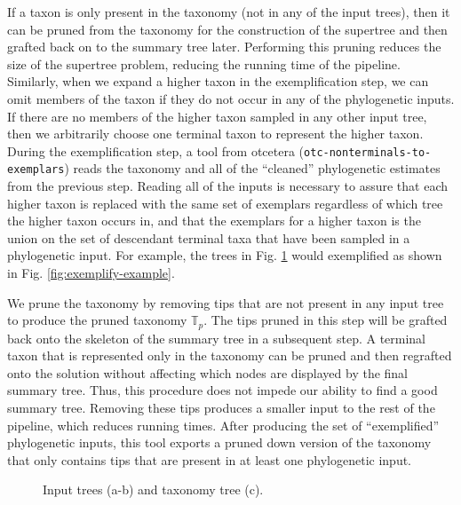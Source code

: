 \documentclass[fleqn,12pt,lineno,english]{wlpeerj}
\begin{document}
If a taxon is only present in the taxonomy (not in any of the input
trees), then it can be pruned from the taxonomy for the construction
of the supertree and then grafted back on to the summary tree later.
Performing this pruning reduces the size of the supertree problem,
reducing the running time of the pipeline. Similarly, when we expand
a higher taxon in the exemplification step, we can omit members of
the taxon if they do not occur in any of the phylogenetic inputs.
If there are no members of the higher taxon sampled in any other input
tree, then we arbitrarily choose one terminal taxon to represent the
higher taxon. During the exemplification step, a tool from otcetera
(\texttt{otc-nonterminals-to-exemplars}) reads the taxonomy and all
of the ``cleaned'' phylogenetic estimates from the previous step.
Reading all of the inputs is necessary to assure that each higher
taxon is replaced with the same set of exemplars regardless of which
tree the higher taxon occurs in, and that the exemplars for a higher
taxon is the union on the set of descendant terminal taxa that have
been sampled in a phylogenetic input. For example, the trees in Fig.
\ref{fig:cleaned-phylo-example} would exemplified as shown in Fig.
\ref{fig:exemplify-example}.

We prune the taxonomy by removing tips that are not present in any
input tree to produce the pruned taxonomy $\mathbb{T}_{p}$. The tips
pruned in this step will be grafted back onto the skeleton of the
summary tree in a subsequent step. A terminal taxon that is represented
only in the taxonomy can be pruned and then regrafted onto the solution
without affecting which nodes are displayed by the final summary tree.
Thus, this procedure does not impede our ability to find a good summary
tree. Removing these tips produces a smaller input to the rest of
the pipeline, which reduces running times. After producing the set
of ``exemplified'' phylogenetic inputs, this tool exports a pruned
down version of the taxonomy that only contains tips that are present
in at least one phylogenetic input.

\begin{figure}
\hfill{}\hfill{}

\caption{Input trees (a-b) and taxonomy tree (c).}
\label{fig:cleaned-phylo-example}
\end{figure}
 
\end{document}
